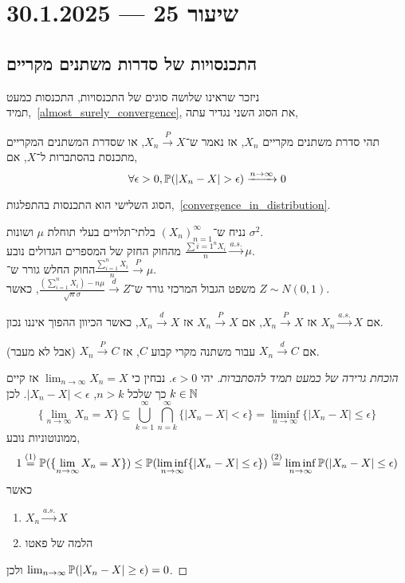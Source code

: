 \section{שיעור 25 --- 30.1.2025}
\subsection{התכנסויות של סדרות משתנים מקריים}
ניזכר שראינו שלושה סוגים של התכנסויות, התכנסות כמעט תמיד,\ \ref{almost_surely_convergence},
את הסוג השני נגדיר עתה,
\begin{definition}
	תהי סדרת משתנים מקריים $X_n$, אז נאמר ש־$X_n \xrightarrow{P} X$, או שסדרת המשתנים המקריים מתכנסת בהסתברות ל־$X$, אם,
	\[
		\forall \epsilon > 0,
		\mathbb{P}(|X_n - X| > \epsilon) \xrightarrow{n \to \infty} 0
	\]
\end{definition}
הסוג השלישי הוא התכנסות בהתפלגות,\ \ref{convergence_in_distribution}.
\begin{example}
	נניח ש־${(X_n)}_{n = 1}^\infty$ בלתי־תלויים בעלי תוחלת $\mu$ ושונות $\sigma^2$. \\
	מהחוק החזק של המספרים הגדולים נובע $\frac{\sum{i = 1}^n X_i}{n} \xrightarrow{a.s.} \mu$. \\
	החוק החלש גורר ש־$\frac{\sum_{i = 1}^{n} X_i}{n} \xrightarrow{P} \mu$. \\
	משפט הגבול המרכזי גורר ש־$\frac{\left( \sum_{i = 1}^{n} X_i \right) - n\mu}{\sqrt{n} \sigma} \xrightarrow{d} Z$,
	כאשר $Z \sim N(0, 1)$.
\end{example}
\begin{theorem}
	אם $X_n \xrightarrow{a.s.} X$ אז $X_n \xrightarrow{P} X$,
	אם $X_n \xrightarrow{P} X$ אז $X_n \xrightarrow{d} X$,
	כאשר הכיוון ההפוך איננו נכון.

	אם $X_n \xrightarrow{d} C$ עבור משתנה מקרי קבוע $C$, אז $X_n \xrightarrow{P} C$ (אבל לא מעבר).
\end{theorem}
\begin{proof}[הוכחת גרירה של כמעט תמיד להסתברות]
	יהי $\epsilon > 0$.
	נבחין כי $\lim_{n \to \infty} X_n = X$ אז קיים $k \in \mathbb{N}$ כך שלכל $n > k$, $|X_n - X| < \epsilon$.
	לכן
	\[
		\{ \lim_{n \to \infty} X_n = X \}
		\subseteq \bigcup_{k = 1}^\infty \bigcap_{n = k}^\infty \{ |X_n - X| < \epsilon \}
		= \liminf_{n \to \infty} \{ |X_n - X| \le \epsilon \}
	\]
	ממונוטוניות נובע,
	\[
		1 \overset{(1)}{=}
		\mathbb{P}(\{ \lim_{n \to \infty} X_n = X \})
		\le \mathbb{P}(\liminf_{n \to \infty} \{ |X_n - X| \le \epsilon \})
		\overset{(2)}{=} \liminf_{n \to \infty} \mathbb{P}(|X_n - X| \le \epsilon)
	\]
	כאשר
	\begin{enumerate}
		\item $X_n \xrightarrow{a.s.} X$
		\item הלמה של פאטו
	\end{enumerate}
	ולכן $\lim_{n \to \infty} \mathbb{P}(|X_n - X| \ge \epsilon) = 0$.
\end{proof}
